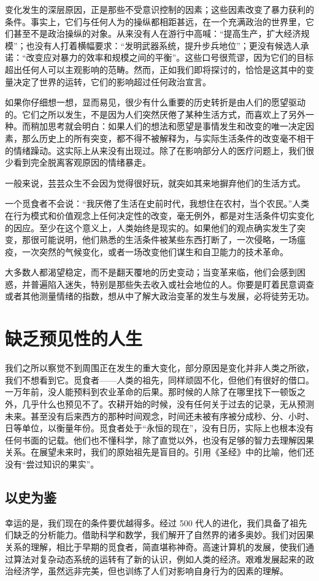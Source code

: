 变化发生的深层原因，正是那些不受意识控制的因素；这些因素改变了暴力获利的条件。事实上，它们与任何人为的操纵都相距甚远，在一个充满政治的世界里，它们甚至不是政治操纵的对象。从来没有人在游行中高喊：“提高生产，扩大经济规模”；也没有人打着横幅要求：“发明武器系统，提升步兵地位”；更没有候选人承诺：“改变应对暴力的效率和规模之间的平衡”。这些口号很荒谬，因为它们的目标超出任何人可以主观影响的范畴。然而，正如我们即将探讨的，恰恰是这其中的变量决定了世界的运转，它们的影响超过任何政治宣言。

如果你仔细想一想，显而易见，很少有什么重要的历史转折是由人们的愿望驱动的。它们之所以发生，不是因为人们突然厌倦了某种生活方式，而喜欢上了另外一种。而稍加思考就会明白：如果人们的想法和愿望是事情发生和改变的唯一决定因素，那么历史上的所有突变，都不得不被解释为，与实际生活条件的改变毫不相干的情绪躁动。这实际上从来没有出现过。除了在影响部分人的医疗问题上，我们很少看到完全脱离客观原因的情绪暴走。

一般来说，芸芸众生不会因为觉得很好玩，就突如其来地摒弃他们的生活方式。

一个觅食者不会说：“我厌倦了生活在史前时代，我想住在农村，当个农民。”人类在行为模式和价值观念上任何决定性的改变，毫无例外，都是对生活条件切实变化的因应。至少在这个意义上，人类始终是现实的。如果他们的观点确实发生了突变，那很可能说明，他们熟悉的生活条件被某些东西打断了，一次侵略，一场瘟疫，一次突然的气候变化，或者一场改变他们谋生和自卫能力的技术革命。

大多数人都渴望稳定，而不是翻天覆地的历史变动；当变革来临，他们会感到困惑，并普遍陷入迷失，特别是那些失去收入或社会地位的人。你要是盯着民意调查或者其他测量情绪的指数，想从中了解大政治变革的发生与发展，必将徒劳无功。

\section{缺乏预见性的人生}
我们之所以察觉不到周围正在发生的重大变化，部分原因是变化并非人类之所欲，我们不想看到它。觅食者——人类的祖先，同样顽固不化，但他们有很好的借口。一万年前，没人能预料到农业革命的后果。那时候的人除了在哪里找下一顿饭之外，几乎什么也预见不了。农耕开始的时候，没有任何关于过去的记录，无从预测未来。甚至没有后来西方的那种时间观念，时间还未被有序被分成秒、分、小时、日等单位，以衡量年份。觅食者处于“永恒的现在”，没有日历，实际上也根本没有任何书面的记载。他们也不懂科学，除了直觉以外，也没有足够的智力去理解因果关系。在展望未来时，我们的原始祖先是盲目的。引用《圣经》中的比喻，他们还没有“尝过知识的果实”。

\subsection{以史为鉴}
幸运的是，我们现在的条件要优越得多。经过 500 代人的进化，我们具备了祖先们缺乏的分析能力。借助科学和数学，我们解开了自然界的诸多奥妙。我们对因果关系的理解，相比于早期的觅食者，简直堪称神奇。高速计算机的发展，使我们通过算法对复杂动态系统的运转有了新的认识，例如人类的经济。艰难发展起来的政治经济学，虽然远非完美，但也训练了人们对影响自身行为的因素的理解。

